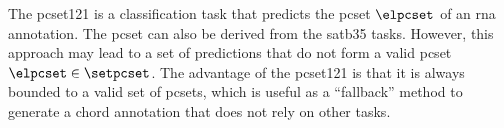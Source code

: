 
The \gls{pcset121} is a classification task that predicts
the \gls{pcset} $\elpcset$ of an \gls{rna} annotation. The
\gls{pcset} can also be derived from the \gls{satb35} tasks.
However, this approach may lead to a set of predictions that
do not form a valid \gls{pcset} $\elpcset \in \setpcset$.
The advantage of the \gls{pcset121} is that it is always
bounded to a valid set of \gls{pcset}s, which is useful as a
``fallback'' method to generate a chord annotation that does
not rely on other tasks.




